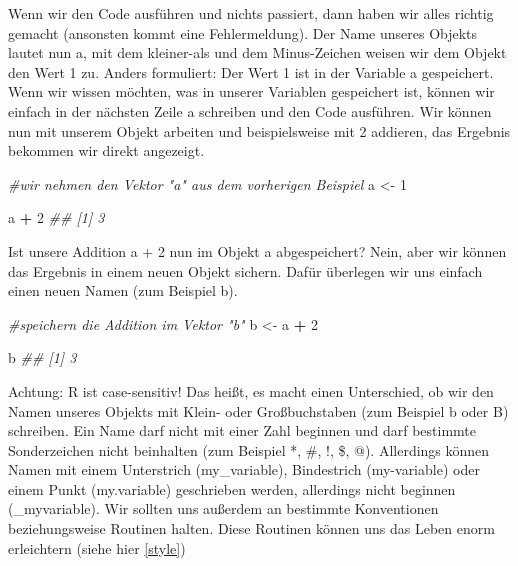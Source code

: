 \documentclass[
]{book}
\newenvironment{Shaded}{\begin{snugshade}}{\end{snugshade}}
\newcommand{\CommentTok}[1]{\textcolor[rgb]{0.56,0.35,0.01}{\textit{#1}}}
\newcommand{\DecValTok}[1]{\textcolor[rgb]{0.00,0.00,0.81}{#1}}
\newcommand{\NormalTok}[1]{#1}
\newcommand{\OperatorTok}[1]{\textcolor[rgb]{0.81,0.36,0.00}{\textbf{#1}}}
\newcommand{\StringTok}[1]{\textcolor[rgb]{0.31,0.60,0.02}{#1}}
\begin{document}
Wenn wir den Code ausführen und nichts passiert, dann haben wir alles richtig gemacht (ansonsten kommt eine Fehlermeldung). Der Name unseres Objekts lautet nun a, mit dem kleiner-als und dem Minus-Zeichen weisen wir dem Objekt den Wert 1 zu. Anders formuliert: Der Wert 1 ist in der Variable a gespeichert. Wenn wir wissen möchten, was in unserer Variablen gespeichert ist, können wir einfach in der nächsten Zeile a schreiben und den Code ausführen. Wir können nun mit unserem Objekt arbeiten und beispielsweise mit 2 addieren, das Ergebnis bekommen wir direkt angezeigt.

\begin{Shaded}
\begin{Highlighting}[]
\CommentTok{#wir nehmen den Vektor "a" aus dem vorherigen Beispiel}
\NormalTok{a <-}\StringTok{ }\DecValTok{1}

\NormalTok{a }\OperatorTok{+}\StringTok{ }\DecValTok{2}
\CommentTok{## [1] 3}
\end{Highlighting}
\end{Shaded}

Ist unsere Addition a + 2 nun im Objekt a abgespeichert? Nein, aber wir können das Ergebnis in einem neuen Objekt sichern. Dafür überlegen wir uns einfach einen neuen Namen (zum Beispiel b).

\begin{Shaded}
\begin{Highlighting}[]
\CommentTok{#speichern die Addition im Vektor "b"}
\NormalTok{b <-}\StringTok{ }\NormalTok{a }\OperatorTok{+}\StringTok{ }\DecValTok{2}

\NormalTok{b}
\CommentTok{## [1] 3}
\end{Highlighting}
\end{Shaded}

Achtung: R ist case-sensitiv! Das heißt, es macht einen Unterschied, ob wir den Namen unseres Objekts mit Klein- oder Großbuchstaben (zum Beispiel b oder B) schreiben. Ein Name darf nicht mit einer Zahl beginnen und darf bestimmte Sonderzeichen nicht beinhalten (zum Beispiel *, \#, !, \$, @). Allerdings können Namen mit einem Unterstrich (my\_variable), Bindestrich (my-variable) oder einem Punkt (my.variable) geschrieben werden, allerdings nicht beginnen (\_myvariable). Wir sollten uns außerdem an bestimmte Konventionen beziehungsweise Routinen halten. Diese Routinen können uns das Leben enorm erleichtern (siehe hier \ref{style})

  
\end{document}
